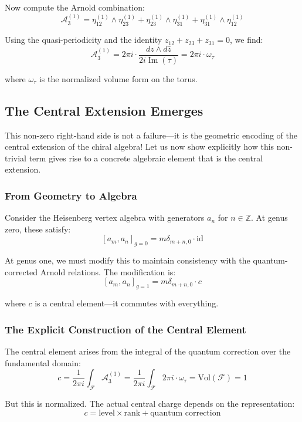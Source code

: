 Now compute the Arnold combination:
$$\mathcal{A}_3^{(1)} = \eta_{12}^{(1)} \wedge \eta_{23}^{(1)} + \eta_{23}^{(1)} \wedge \eta_{31}^{(1)} + \eta_{31}^{(1)} \wedge \eta_{12}^{(1)}$$

Using the quasi-periodicity and the identity $z_{12} + z_{23} + z_{31} = 0$, we find:
$$\mathcal{A}_3^{(1)} = 2\pi i \cdot \frac{dz \wedge d\bar{z}}{2i\operatorname{Im}(\tau)} = 2\pi i \cdot \omega_\tau$$

where $\omega_\tau$ is the normalized volume form on the torus.

\subsection{The Central Extension Emerges}

This non-zero right-hand side is not a failure—it is the geometric encoding of the central extension of the chiral algebra! Let us now show explicitly how this non-trivial term gives rise to a concrete algebraic element that is the central extension.

\subsubsection{From Geometry to Algebra}

Consider the Heisenberg vertex algebra with generators $a_n$ for $n \in \mathbb{Z}$. At genus zero, these satisfy:
$$[a_m, a_n]_{g=0} = m\delta_{m+n,0} \cdot \text{id}$$

At genus one, we must modify this to maintain consistency with the quantum-corrected Arnold relations. The modification is:
$$[a_m, a_n]_{g=1} = m\delta_{m+n,0} \cdot c$$

where $c$ is a central element—it commutes with everything.

\subsubsection{The Explicit Construction of the Central Element}

The central element arises from the integral of the quantum correction over the fundamental domain:
$$c = \frac{1}{2\pi i}\int_{\mathcal{F}} \mathcal{A}_3^{(1)} = \frac{1}{2\pi i}\int_{\mathcal{F}} 2\pi i \cdot \omega_\tau = \text{Vol}(\mathcal{F}) = 1$$

But this is normalized. The actual central charge depends on the representation:
$$c = \text{level} \times \text{rank} + \text{quantum correction}$$

